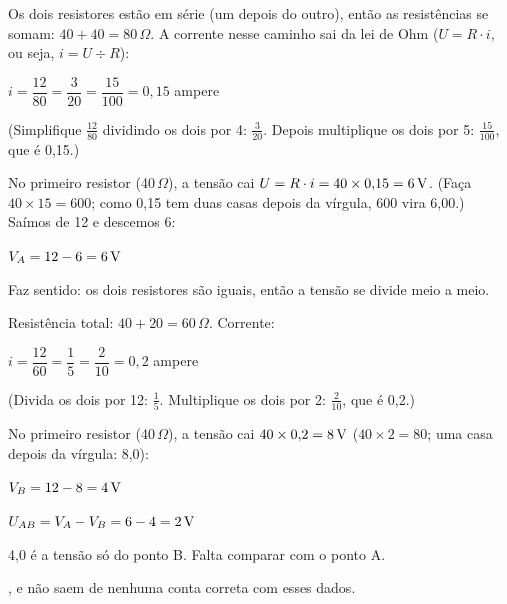 Os dois resistores estão em série (um depois do outro), então as resistências se somam: $40 + 40 = 80\,\Omega$.
A corrente nesse caminho sai da lei de Ohm ($U = R \cdot i$, ou seja, $i = U \div R$):
\begin{conta}
$i = \dfrac{12}{80} = \dfrac{3}{20} = \dfrac{15}{100} = 0{,}15$ ampere
\end{conta}
(Simplifique $\frac{12}{80}$ dividindo os dois por 4: $\frac{3}{20}$. Depois multiplique os dois por 5: $\frac{15}{100}$, que é 0,15.)

No primeiro resistor (40\,$\Omega$), a tensão cai $U = R \cdot i = 40 \times 0{,}15 = 6\,\text{V}$.
(Faça $40 \times 15 = 600$; como 0,15 tem duas casas depois da vírgula, 600 vira 6,00.) Saímos de 12 e descemos 6:
\begin{conta}
$V_A = 12 - 6 = 6\,\text{V}$
\end{conta}
Faz sentido: os dois resistores são iguais, então a tensão se divide meio a meio.

Resistência total: $40 + 20 = 60\,\Omega$. Corrente:
\begin{conta}
$i = \dfrac{12}{60} = \dfrac{1}{5} = \dfrac{2}{10} = 0{,}2$ ampere
\end{conta}
(Divida os dois por 12: $\frac{1}{5}$. Multiplique os dois por 2: $\frac{2}{10}$, que é 0,2.)

No primeiro resistor (40\,$\Omega$), a tensão cai $40 \times 0{,}2 = 8\,\text{V}$ ($40 \times 2 = 80$; uma casa depois da vírgula: 8,0):
\begin{conta}
$V_B = 12 - 8 = 4\,\text{V}$
\end{conta}

\Needspace{95mm}%
\begin{conta}
$U_{AB} = V_A - V_B = 6 - 4 = 2\,\text{V}$
\end{conta}


\begin{outras}
 4,0 é a tensão só do ponto B. Falta comparar com o ponto A.\par
{},  e  não saem de nenhuma conta correta com esses dados.
\end{outras}


